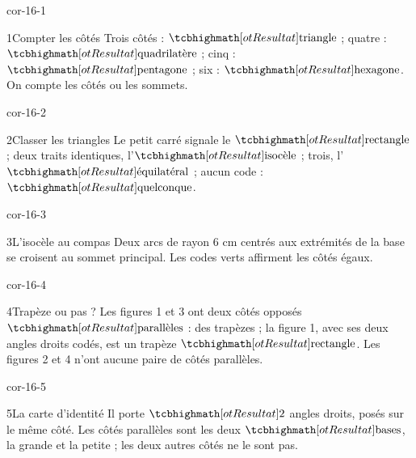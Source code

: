 \clearpage\pagestyle{otMain}\setlength{\otBlocEspacement}{2.5mm}\fontsize{11}{15}\selectfont{}
\begin{blocLivre}{cor-16-1}\begin{corrige}{1}{Compter les côtés}
Trois côtés : $\res{\text{triangle}}$ ; quatre : $\res{\text{quadrilatère}}$ ; cinq : $\res{\text{pentagone}}$ ; six : $\res{\text{hexagone}}$. On compte les côtés ou les sommets.
\label{fig-cor-16-1}
\end{corrige}\end{blocLivre}
\begin{blocLivre}{cor-16-2}\begin{corrige}{2}{Classer les triangles}
Le petit carré signale le $\res{\text{rectangle}}$ ; deux traits identiques, l’$\res{\text{isocèle}}$ ; trois, l’$\res{\text{équilatéral}}$ ; aucun code : $\res{\text{quelconque}}$.
\label{fig-cor-16-2}
\end{corrige}\end{blocLivre}
\begin{blocLivre}{cor-16-3}\begin{corrige}{3}{L’isocèle au compas}
Deux arcs de rayon 6 cm centrés aux extrémités de la base se croisent au sommet principal. Les codes verts affirment les côtés égaux.
\label{fig-cor-16-3}
\end{corrige}\end{blocLivre}
\begin{blocLivre}{cor-16-4}\begin{corrige}{4}{Trapèze ou pas ?}
Les figures 1 et 3 ont deux côtés opposés $\res{\text{parallèles}}$ : des trapèzes ; la figure 1, avec ses deux angles droits codés, est un trapèze $\res{\text{rectangle}}$. Les figures 2 et 4 n’ont aucune paire de côtés parallèles.
\label{fig-cor-16-4}
\end{corrige}\end{blocLivre}
\begin{blocLivre}{cor-16-5}\begin{corrige}{5}{La carte d’identité}
Il porte $\res2$ angles droits, posés sur le même côté. Les côtés parallèles sont les deux $\res{\text{bases}}$, la grande et la petite ; les deux autres côtés ne le sont pas.
\label{fig-cor-16-5}
\end{corrige}\end{blocLivre}
